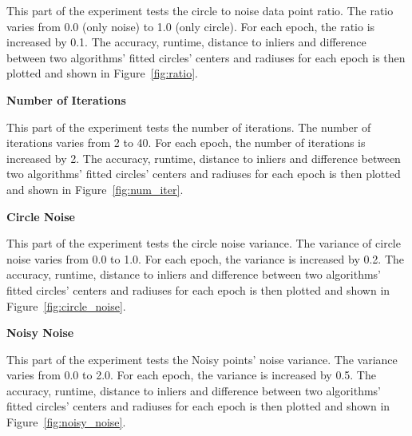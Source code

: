 \documentclass[10pt,twocolumn,letterpaper]{article}
\begin{document}
This part of the experiment tests the circle to noise data point ratio. The ratio varies from 0.0 (only noise) to 1.0 (only circle). For each epoch, the ratio is increased by 0.1. The accuracy, runtime, distance to inliers and difference between two algorithms' fitted circles' centers and radiuses for each epoch is then plotted and shown in Figure~\ref{fig:ratio}.


\textbf{Number of Iterations}

This part of the experiment tests the number of iterations. The number of iterations varies from 2 to 40. For each epoch, the number of iterations is increased by 2. The accuracy, runtime, distance to inliers and difference between two algorithms' fitted circles' centers and radiuses for each epoch is then plotted and shown in Figure~\ref{fig:num_iter}.


\textbf{Circle Noise}

This part of the experiment tests the circle noise variance. The variance of circle noise varies from 0.0 to 1.0. For each epoch, the variance is increased by 0.2. The accuracy, runtime, distance to inliers and difference between two algorithms' fitted circles' centers and radiuses for each epoch is then plotted and shown in Figure~\ref{fig:circle_noise}.


\textbf{Noisy Noise}

This part of the experiment tests the Noisy points' noise variance. The variance varies from 0.0 to 2.0. For each epoch, the variance is increased by 0.5. The accuracy, runtime, distance to inliers and difference between two algorithms' fitted circles' centers and radiuses for each epoch is then plotted and shown in Figure~\ref{fig:noisy_noise}.
\end{document}
